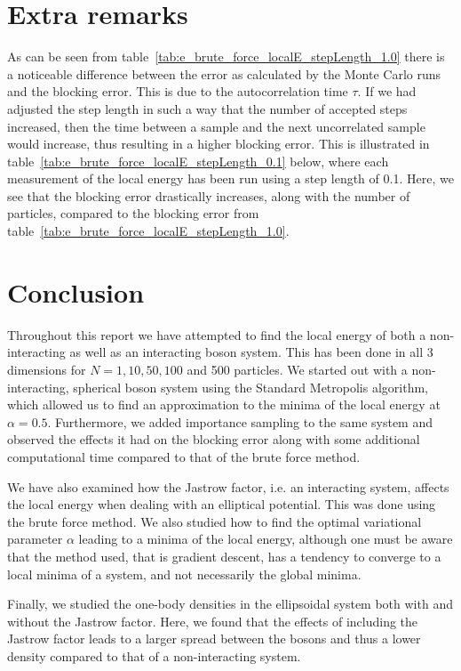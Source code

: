 \documentclass[
    a4paper, aps, twocolumn, floatfix, superscriptaddress,
    nofootinbib]{revtex4-1}
\begin{document}
\section{Extra remarks}\label{sec:extra_remarks}
As can be seen from table~\ref{tab:e_brute_force_localE_stepLength_1.0} there is a noticeable difference between the error as calculated by the Monte Carlo runs and the blocking error. This is due to the autocorrelation time $\tau$. If we had adjusted the step length in such a way that the number of accepted steps increased, then the time between a sample and the next uncorrelated sample would increase, thus resulting in a higher blocking error. This is illustrated in table~\ref{tab:e_brute_force_localE_stepLength_0.1} below, where each measurement of the local energy has been run using a step length of 0.1. Here, we see that the blocking error drastically increases, along with the number of particles, compared to the blocking error from table~\ref{tab:e_brute_force_localE_stepLength_1.0}.

\section{Conclusion}
Throughout this report we have attempted to find the local energy of both a non-interacting as well as an interacting boson system. This has been done in all 3 dimensions for $N = 1, 10, 50, 100$ and 500 particles. We started out with a non-interacting, spherical boson system using the Standard Metropolis algorithm, which allowed us to find an approximation to the minima of the local energy at $\alpha = 0.5$. 
Furthermore, we added importance sampling to the same system and observed the effects it had on the blocking error along with some additional computational time compared to that of the brute force method.

 We have also examined how the Jastrow factor, i.e. an interacting system, affects the local energy when dealing with an elliptical potential. This was done using the brute force method. We also studied how to find the optimal variational parameter $\alpha$ leading to a minima of the local energy, although one must be aware that the method used, that is gradient descent, has a tendency to converge to a local minima of a system, and not necessarily the global minima.
 
 Finally, we studied the one-body densities in the ellipsoidal system both with and without the Jastrow factor. Here, we found that the effects of including the Jastrow factor leads to a larger spread between the bosons and thus a lower density compared to that of a non-interacting system.
\end{document}
